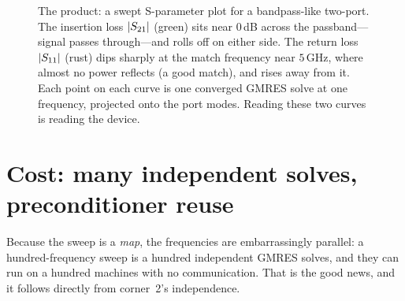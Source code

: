 \begin{figure}[t]
\centering
{}
\caption[A swept S-parameter plot]{The product: a swept S-parameter plot for a
bandpass-like two-port. The insertion loss $\lvert S_{21}\rvert$ (green) sits near
$0\,$dB across the passband---signal passes through---and rolls off on either
side. The return loss $\lvert S_{11}\rvert$ (rust) dips sharply at the match frequency
near $5\,$GHz, where almost no power reflects (a good match), and rises away from
it. Each point on each curve is one converged GMRES solve at one frequency,
projected onto the port modes. Reading these two curves is reading the device.}
\label{fig:splot}
\end{figure}

\section{Cost: many independent solves, preconditioner reuse}
\label{sec:cost}

Because the sweep is a \emph{map}, the frequencies are embarrassingly parallel: a
hundred-frequency sweep is a hundred independent GMRES solves, and they can run on a
hundred machines with no communication. That is the good news, and it follows
directly from corner~2's independence.

